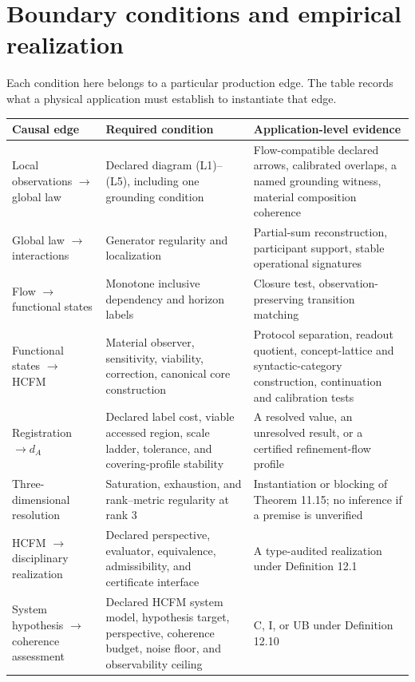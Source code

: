 \documentclass[11pt]{article}
\theoremstyle{definition}
\begin{document}
\section{Boundary conditions and empirical realization}

Each condition here belongs to a particular production edge. The table records what a physical application must establish to instantiate that edge.

\begin{center}
\small
\begin{longtable}{@{}p{}p{}p{}@{}}
\toprule
Causal edge & Required condition & Application-level evidence\\
\midrule
\endhead
Local observations $\to$ global law & Declared diagram (L1)--(L5), including one grounding condition & Flow-compatible declared arrows, calibrated overlaps, a named grounding witness, material composition coherence\\
Global law $\to$ interactions & Generator regularity and localization & Partial-sum reconstruction, participant support, stable operational signatures\\
Flow $\to$ functional states & Monotone inclusive dependency and horizon labels & Closure test, observation-preserving transition matching\\
Functional states $\to$ HCFM & Material observer, sensitivity, viability, correction, canonical core construction & Protocol separation, readout quotient, concept-lattice and syntactic-category construction, continuation and calibration tests\\
Registration $\to d_A$ & Declared label cost, viable accessed region, scale ladder, tolerance, and covering-profile stability & A resolved value, an unresolved result, or a certified refinement-flow profile\\
Three-dimensional resolution & Saturation, exhaustion, and rank--metric regularity at rank 3 & Instantiation or blocking of Theorem 11.15; no inference if a premise is unverified\\
HCFM $\to$ disciplinary realization & Declared perspective, evaluator, equivalence, admissibility, and certificate interface & A type-audited realization under Definition 12.1\\
System hypothesis $\to$ coherence assessment & Declared HCFM system model, hypothesis target, perspective, coherence budget, noise floor, and observability ceiling & C, I, or UB under Definition 12.10\\

\end{longtable}
\end{center}
\end{document}

